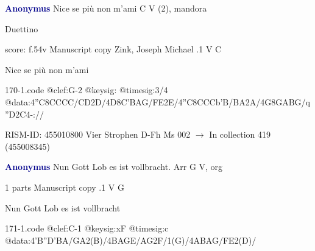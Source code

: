 \documentclass[twocolumn]{book}
\begin{document}
\newline \par \vspace{7pt} \textcolor{darkblue}{\textbf{Anonymus  }}
\newline Nice se più non m'ami  C  
\newline V (2), mandora
\newline \begin{itshape}[at left, f.54v:] Duettino\end{itshape} 
\newline \textcolor{darkblue}{}  score: f.54v  
\newline Manuscript copy
\newline Zink, Joseph Michael
.1  V  C
\newline \begin{footnotesize} Nice se più non m'ami \end{footnotesize}  
\begin{filecontents*}{170-1.code}
@clef:G-2
@keysig:
@timesig:3/4
@data:4''C8CCCC/{CD}2D/4D8C'BAG/{FE}2E/4''C8CCCb'B/{BA}2A/4G8GABG/q''D2C4-://
\end{filecontents*}
\newline
%

\newline RISM-ID: 455010800
\newline Vier Strophen
\newline D-Fh  Ms 002
\newline $\rightarrow$ In collection 419 (455008345)

\newline \par \vspace{7pt} \textcolor{darkblue}{\textbf{Anonymus  }}
\newline Nun Gott Lob es ist vollbracht. Arr  G  
\newline V, org
\newline \begin{itshape}\end{itshape} 
\newline \textcolor{darkblue}{}  1 parts  
\newline Manuscript copy
.1  V  G
\newline \begin{footnotesize} Nun Gott Lob es ist vollbracht \end{footnotesize}  
\begin{filecontents*}{171-1.code}
@clef:C-1
@keysig:xF
@timesig:c
@data:4'B''D'BA/GA2(B)/4BAGE/AG2F/1(G)/4ABAG/FE2(D)/
\end{filecontents*}
\newline
%
\end{document}
